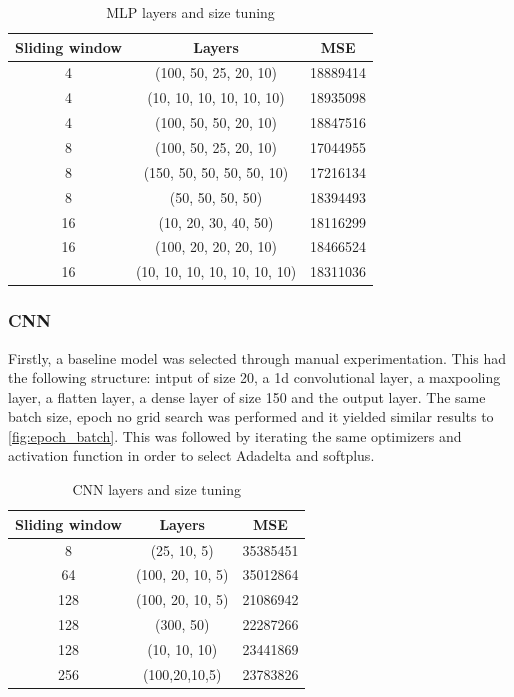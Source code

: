 \documentclass[12pt]{article}
\begin{document}
  \begin{table}
    \begin{center}
      \caption{MLP layers and size tuning}
      \label{tab:layers}
      \begin{tabular}{c|c|c}
        \textbf{Sliding window} & \textbf{Layers} & \textbf{MSE}\\
        \hline
        4 & (100, 50, 25, 20, 10) & 18889414\\
        4 & (10, 10, 10, 10, 10, 10) & 18935098\\
        4 & (100, 50, 50, 20, 10) & 18847516\\
        8 & (100, 50, 25, 20, 10) & 17044955\\
        8 & (150, 50, 50, 50, 50, 10) & 17216134\\
        8 & (50, 50, 50, 50) & 18394493\\
        16 & (10, 20, 30, 40, 50) & 18116299\\
        16 & (100, 20, 20, 20, 10) & 18466524\\
        16 & (10, 10, 10, 10, 10, 10, 10) & 18311036\\
      \end{tabular}
    \end{center}
  \end{table}

  \subsubsection{CNN}
  Firstly, a baseline model was selected through manual experimentation. This had the following structure:
  intput of size 20, a 1d convolutional layer, a maxpooling layer, a flatten layer, a dense layer of size 150 
  and the output layer. The same batch size, epoch no grid search was performed and it yielded similar results 
  to \ref{fig:epoch_batch}. This was followed by iterating the same optimizers and activation function in 
  order to select Adadelta and softplus. 

  \begin{table}
    \begin{center}
      \caption{CNN layers and size tuning}
      \label{tab:layers_cnn}
      \begin{tabular}{c|c|c}
        \textbf{Sliding window} & \textbf{Layers} & \textbf{MSE}\\
        \hline
        8 & (25, 10, 5) & 35385451\\
        64 & (100, 20, 10, 5) & 35012864\\
        128 & (100, 20, 10, 5) & 21086942\\
        128 & (300, 50) & 22287266\\
        128 & (10, 10, 10) & 23441869\\
        256 & (100,20,10,5) & 23783826\\
      \end{tabular}
    \end{center}
  \end{table}
\end{document}
